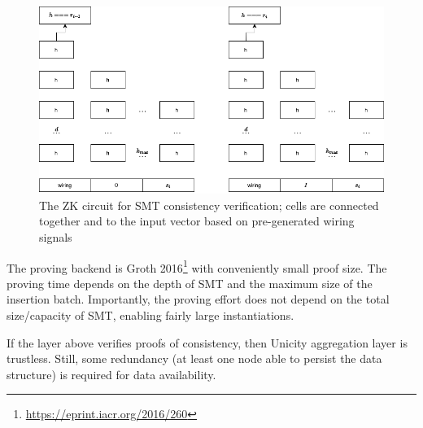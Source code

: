 \begin{figure}[htb]
    \centering
    \includegraphics[width=\textwidth]{smt-circuit.drawio}
    \caption{The ZK circuit for SMT consistency verification; cells are connected together and to the input vector based on pre-generated wiring signals}
    \label{fig:zk-circuit}
\end{figure}

The proving backend is Groth 2016\footnote{\url{https://eprint.iacr.org/2016/260}} with conveniently small proof size. The proving time depends on the depth of SMT and the maximum size of the insertion batch. Importantly, the proving effort does not depend on the total size/capacity of SMT, enabling fairly large instantiations.

If the layer above verifies proofs of consistency, then Unicity aggregation layer is trustless. Still, some redundancy (at least one node able to persist the data structure) is required for data availability.
